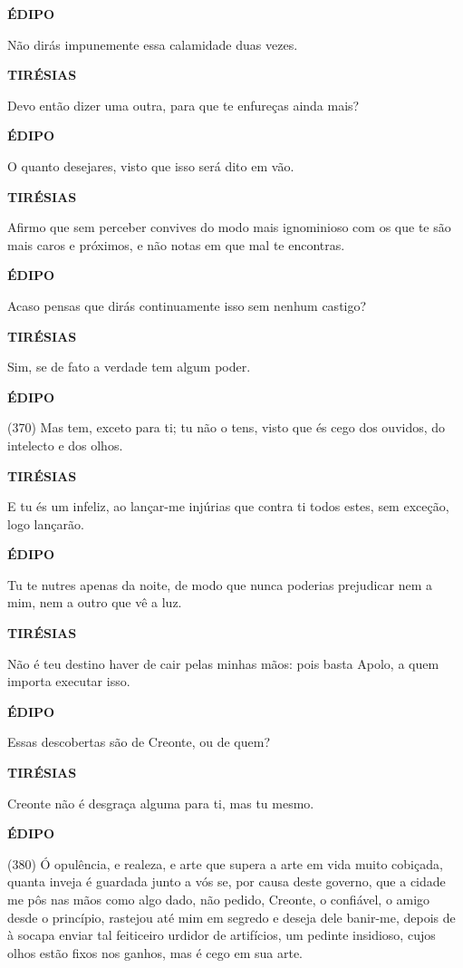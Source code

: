 \textbf{ÉDIPO}

Não dirás impunemente essa calamidade duas vezes.

\textbf{TIRÉSIAS}

Devo então dizer uma outra, para que te enfureças ainda mais?

\textbf{ÉDIPO}

O quanto desejares, visto que isso será dito em vão.

\textbf{TIRÉSIAS}

Afirmo que sem perceber convives do modo mais ignominioso com os que te
são mais caros e próximos, e não notas em que mal te encontras.

\textbf{ÉDIPO}

Acaso pensas que dirás continuamente isso sem nenhum castigo?

\textbf{TIRÉSIAS}

Sim, se de fato a verdade tem algum poder.

\textbf{ÉDIPO}

(370) Mas tem, exceto para ti; tu não o tens, visto que és cego dos
ouvidos, do intelecto e dos olhos.

\textbf{TIRÉSIAS}

E tu és um infeliz, ao lançar-me injúrias que contra ti todos estes, sem
exceção, logo lançarão.

\textbf{ÉDIPO}

Tu te nutres apenas da noite, de modo que nunca poderias prejudicar nem
a mim, nem a outro que vê a luz.

\textbf{TIRÉSIAS}

Não é teu destino haver de cair pelas minhas mãos: pois basta Apolo, a
quem importa executar isso.

\textbf{ÉDIPO}

Essas descobertas são de Creonte, ou de quem?

\textbf{TIRÉSIAS}

Creonte não é desgraça alguma para ti, mas tu mesmo.

\textbf{ÉDIPO}

(380) Ó opulência, e realeza, e arte que supera a arte em vida muito
cobiçada, quanta inveja é guardada junto a vós se, por causa deste
governo, que a cidade me pôs nas mãos como algo dado, não pedido,
Creonte, o confiável, o amigo desde o princípio, rastejou até mim em
segredo e deseja dele banir-me, depois de à socapa enviar tal feiticeiro
urdidor de artifícios, um pedinte insidioso, cujos olhos estão fixos nos
ganhos, mas é cego em sua arte.

